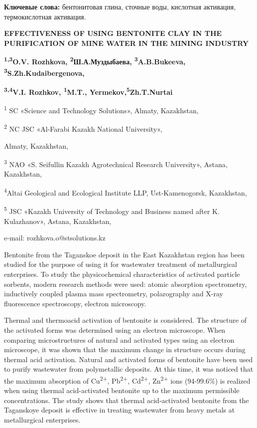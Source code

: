 \textbf{Ключевые слова:} бентонитовая глина, сточные воды, кислотная
активация, термокислотная активация.

\textbf{EFFECTIVENESS OF USING BENTONITE CLAY IN THE PURIFICATION OF
MINE WATER IN THE MINING INDUSTRY}

\textbf{\textsuperscript{1,3}O.V. Rozhkova,
\textsuperscript{2}Ш.А.Муздыбаева, \textsuperscript{3}A.B.Bukeeva,
\textsuperscript{3}S.Zh.Kudaibergenova,}

\textbf{\textsuperscript{3,4}V.I. Rozhkov, \textsuperscript{1}M.T.,
Yermekov,\textsuperscript{5}Zh.T.Nurtai}

\textsuperscript{1} SC «Science and Technology Solutions», Almaty,
Kazakhstan,

\textsuperscript{2} NC JSC «Al-Farabi Kazakh National University»,

Almaty, Kazakhstan,

\textsuperscript{3} NAO «S. Seifullin Kazakh Agrotechnical Research
University», Astana, Kazakhstan,

\textsuperscript{4}Altai Geological and Ecological Institute LLP,
Ust-Kamenogorsk, Kazakhstan,

\textsuperscript{5} JSC «Kazakh University of Technology and Business
named after K. Kulazhanov», Astana, Kazakhstan,

e-mail: rozhkova.o@stsolutions.kz

Bentonite from the Taganskoe deposit in the East Kazakhstan region has
been studied for the purpose of using it for wastewater treatment of
metallurgical enterprises. To study the physicochemical characteristics
of activated particle sorbents, modern research methods were used:
atomic absorption spectrometry, inductively coupled plasma mass
spectrometry, polarography and X-ray fluorescence spectroscopy, electron
microscopy.

Thermal and thermoacid activation of bentonite is considered. The
structure of the activated forms was determined using an electron
microscope. When comparing microstructures of natural and activated
types using an electron microscope, it was shown that the maximum change
in structure occurs during thermal acid activation. Natural and
activated forms of bentonite have been used to purify wastewater from
polymetallic deposits. At this time, it was noticed that the maximum
absorption of Cu\textsuperscript{2+}, Pb\textsuperscript{2+},
Cd\textsuperscript{2+}, Zn\textsuperscript{2+} ions (94-99.6\%) is
realized when using thermal acid-activated bentonite up to the maximum
permissible concentrations. The study shows that thermal acid-activated
bentonite from the Taganskoye deposit is effective in treating
wastewater from heavy metals at metallurgical enterprises.

